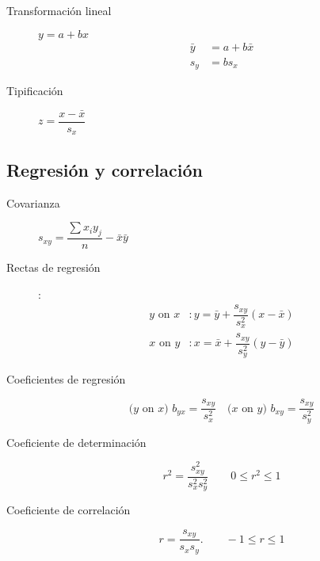 \begin{multicols*}{2}
\begin{tcolorbox}[hbox, title=Transformaciones lineales]
\begin{minipage}{0.4\textwidth}
\begin{description}
\item[Transformación lineal] $y=a+bx$
      \begin{align*}
      \bar y & = a+b\bar x \\
      s_y    & = bs_x
      \end{align*}
\item[Tipificación] $z=\dfrac{x-\bar x}{s_x}$
\end{description}
\end{minipage}
\end{tcolorbox}


\subsection*{Regresión y correlación}

\begin{tcolorbox}[hbox, title=Regresión lineal]
\begin{minipage}{0.4\textwidth}
\begin{description}
\item [Covarianza] $s_{xy}=\dfrac{\sum x_iy_j}{n}-\bar{x}\bar{y}$
\item [Rectas de regresión]:
      \begin{align*}
      \mbox{$y$ on $x$} & : y=\bar{y}+\dfrac{s_{xy}}{s_x^2}(x-\bar{x}) \\
      \mbox{$x$ on $y$} & : x=\bar{x}+\dfrac{s_{xy}}{s_y^2}(y-\bar{y})
      \end{align*}
\item [Coeficientes de regresión]
      \[
      \mbox{($y$ on $x$) } b_{yx}=\dfrac{s_{xy}}{s_x^2}\quad \mbox{($x$ on
      $y$) } b_{xy}=\dfrac{s_{xy}}{s_y^2}
      \]
\item[Coeficiente de determinación]
      \[r^2=\dfrac{s_{xy}^2}{s_x^2s_y^2} \qquad 0\leq r^2\leq 1\]
\item[Coeficiente de correlación]
      \[r=\dfrac{s_{xy}}{s_xs_y}.\qquad -1\leq r\leq 1\]
\end{description}
\end{minipage}
\end{tcolorbox}

\medskip


\end{multicols*}
